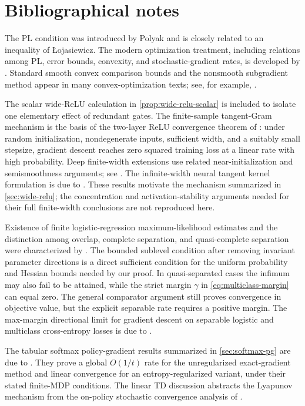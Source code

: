 \documentclass[11pt,twoside]{article}
\theoremstyle{definition}
\theoremstyle{remark}
\begin{document}
\clearpage
\printendnotes

\section*{Bibliographical notes}

The PL condition was introduced by Polyak and is closely related to an
inequality of \L{}ojasiewicz. The modern optimization treatment, including
relations among PL, error bounds, convexity, and stochastic-gradient rates,
is developed by \citet{karimi2016}. Standard smooth convex comparison bounds
and the nonsmooth subgradient method appear in many convex-optimization texts;
see, for example, \citet{bubeck2015}.

The scalar wide-ReLU calculation in \cref{prop:wide-relu-scalar} is included
to isolate one elementary effect of redundant gates. The finite-sample
tangent-Gram mechanism is the basis of the two-layer ReLU convergence theorem
of \citet{du2019}: under random initialization, nondegenerate inputs,
sufficient width, and a suitably small stepsize, gradient descent reaches zero
squared training loss at a linear rate with high probability. Deep finite-width
extensions use related near-initialization and semismoothness arguments; see
\citet{allenzhu2019}. The infinite-width neural tangent kernel formulation is
due to \citet{jacot2018}. These results motivate the mechanism summarized in
\cref{sec:wide-relu}; the concentration and activation-stability arguments
needed for their full finite-width conclusions are not reproduced here.

Existence of finite logistic-regression maximum-likelihood estimates and the
distinction among overlap, complete separation, and quasi-complete separation
were characterized by \citet{albert1984}. The bounded sublevel condition after
removing invariant parameter directions is a direct sufficient condition for
the uniform probability and Hessian bounds needed by our proof. In quasi-separated
cases the infimum may also fail to be attained, while the strict margin
$\gamma$ in \cref{eq:multiclass-margin} can equal zero. The general comparator
argument still proves convergence in objective value, but the explicit
separable rate requires a positive margin. The max-margin directional limit
for gradient descent on separable logistic and multiclass cross-entropy losses
is due to \citet{soudry2018}.

The tabular softmax policy-gradient results summarized in
\cref{sec:softmax-pg} are due to \citet{mei2020}. They prove a global
$O(1/t)$ rate for the unregularized exact-gradient method and linear
convergence for an entropy-regularized variant, under their stated finite-MDP
conditions. The linear TD discussion abstracts the Lyapunov mechanism from
the on-policy stochastic convergence analysis of \citet{tsitsiklis1997}.
\end{document}
